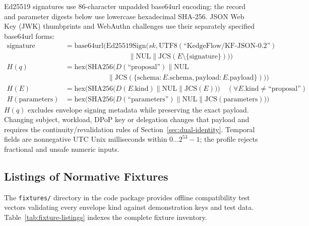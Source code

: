 Ed25519 signatures use 86-character unpadded base64url encoding; the record and parameter digests below use lowercase hexadecimal SHA-256. JSON Web Key (JWK) thumbprints and WebAuthn challenges use their separately specified base64url forms:
\begin{align*}
\mathrm{signature} &= \mathrm{base64url}\bigl(\mathrm{Ed25519Sign}\bigl(sk, \mathrm{UTF8}(\text{``KedgeFlow/KF-JSON-0.2''}) \\
&\qquad\qquad\qquad\qquad\quad \parallel \mathrm{NUL} \parallel \mathrm{JCS}(E \setminus \{\text{signature}\})\bigr)\bigr) \\
H(q) &= \mathrm{hex}\bigl(\mathrm{SHA256}\bigl(D(\text{``proposal''}) \parallel \mathrm{NUL} \\
&\qquad\qquad\qquad \parallel \mathrm{JCS}(\{\text{schema}: E.\text{schema}, \text{payload}: E.\text{payload}\})\bigr)\bigr) \\
H(E) &= \mathrm{hex}\bigl(\mathrm{SHA256}\bigl(D(E.\text{kind}) \parallel \mathrm{NUL} \parallel \mathrm{JCS}(E)\bigr)\bigr) \quad (\forall E.\text{kind} \neq \text{``proposal''}) \\
H(\mathrm{parameters}) &= \mathrm{hex}\bigl(\mathrm{SHA256}\bigl(D(\text{``parameters''}) \parallel \mathrm{NUL} \parallel \mathrm{JCS}(\mathrm{parameters})\bigr)\bigr)
\end{align*}
$H(q)$ excludes envelope signing metadata while preserving the exact payload. Changing subject, workload, DPoP key or delegation changes that payload and requires the continuity/revalidation rules of Section~\ref{sec:dual-identity}. Temporal fields are nonnegative UTC Unix milliseconds within $0\ldots 2^{53}-1$; the profile rejects fractional and unsafe numeric inputs.

\subsection{Listings of Normative Fixtures}
The \texttt{fixtures/} directory in the code package provides offline compatibility test vectors validating every envelope kind against demonstration keys and test data. Table~\ref{tab:fixture-listings} indexes the complete fixture inventory.

